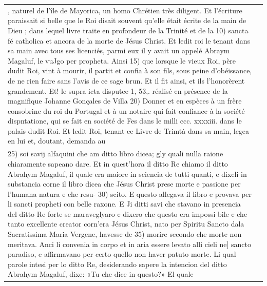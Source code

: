 \begin{longtable}{p{}p{}}
, naturel de l'île de Mayorica, un homo Chrétien très diligent. Et l'écriture paraissait si belle que le Roi disait souvent qu'elle était écrite de la main de Dieu ; dans lequel livre traite en profondeur de la Trinité et de la
10) sancta fé catholica et ancora de la morte de Jésus Christ. Et ledit roi le tenant dans sa main avec tous ses licenciés, parmi eux il y avait un appelé Abraym Magaluf, le vuJgo per propheta. Ainsi
15) que lorsque le vieux Roi, père dudit Roi, vint à mourir, il partit et confia à son fils, sous peine d'obéissance, de ne rien faire sans l'avis de ce sage brun.
Et il fit ainsi, et ils l'honorèrent grandement. Et! le supra icta disputee 1, 53,.
réalisé en présence de la magnifique Johanne Gonçales de Villa
20) Donner et en espèces à un frère consobrine du roi du Portugal et à un notaire qui fait confiance à la société dispntatione, qui se fait en société de Fes dans le milli ccc. xxxxiii. dans le palais dudit Roi. Et ledit Roi, tenant ce Livre de Trimtà dans sa main, legea en lui et, doutant, demanda au
\\

25) soi savij alfaquini che am ditto libro dicea; gly quali nulla raione chiaramente sapeano dare. Et in quest'hora il ditto Re chiamo il ditto Abrahym Magaluf, il quale era maiore in sciencia de tutti quanti, e dixeli in substancia corne il libro dicea che Jésus Christ prese morte e passione per l'humana natura e che resu-
30) scito. E questo allegava il libro e provava per li sancti propheti con belle raxone. E Ji ditti savi che stavano in presencia del ditto Re forte se maraveglyaro e dixero che questo era impossi  bile e che tanto excellente creator corn'era Jésus Christ, nato per Spiritu Sancto dala Sacratissima Maria Vergene, havesse de
35) morire secondo che morte non meritava. Anci li convenia in corpo et in aria essere levato alli cieli ne] sancto paradiso, e affirmavano per certo quello non haver patuto morte. Li qual parole intesi per lo ditto Re, desiderando sapere la intencion del ditto Abrahym Magaluf, dixe: «Tu che dice in questo?» El quale
 & 
         

\end{longtable}
